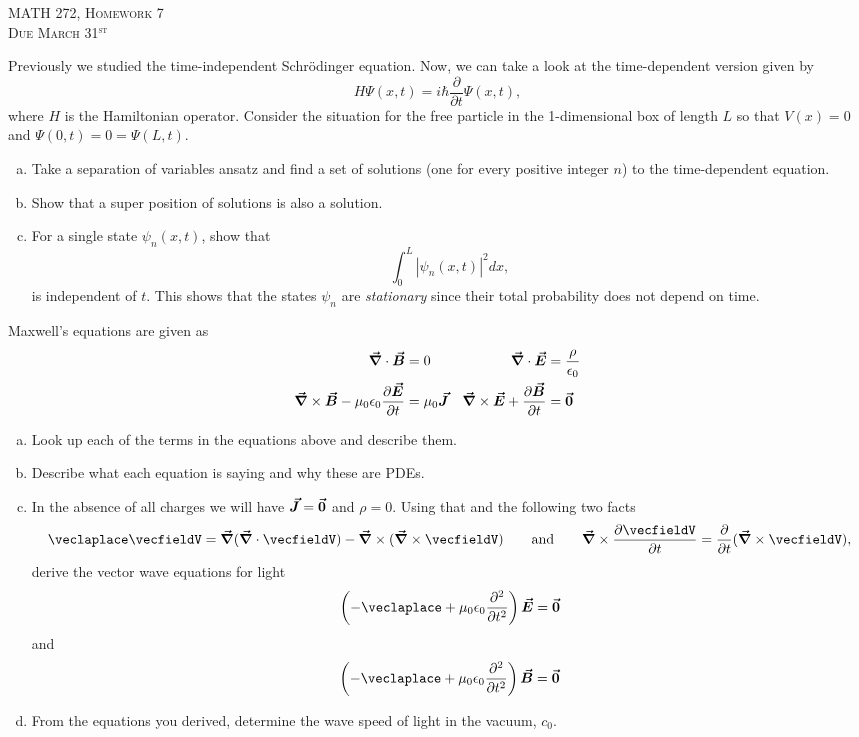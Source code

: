 \documentclass[12pt]{article} %
\newcommand{\grad}{\boldsymbol{\vec{\nabla}}}
\newcommand{\vecfieldE}{\boldsymbol{\vec{E}}}
\newcommand{\vecfieldB}{\boldsymbol{\vec{B}}}
\newcommand{\vecfieldJ}{\boldsymbol{\vec{J}}}
\begin{document}
\begin{center}
   \textsc{\large MATH 272, Homework 7}\\
   \textsc{Due March 31$^\textrm{st}$}
\end{center}
\vspace{.5cm}

\begin{problem}
Previously we studied the time-independent Schr\"odinger equation. Now, we can take a look at the time-dependent version given by
\[
H \Psi(x,t) = i\hbar \frac{\partial}{\partial t} \Psi(x,t),
\]
where $H$ is the Hamiltonian operator.  Consider the situation for the free particle in the 1-dimensional box of length $L$ so that $V(x)=0$ and $\Psi(0,t)=0=\Psi(L,t)$.  
\begin{enumerate}[(a)]
    \item Take a separation of variables ansatz and find a set of solutions (one for every positive integer $n$) to the time-dependent equation.
    \item Show that a super position of solutions is also a solution.
    \item For a single state $\psi_n(x,t)$, show that 
    \[
    \int_0^L \left|\psi_n(x,t)\right|^2 dx,
    \]
    is independent of $t$. This shows that the states $\psi_n$ are \emph{stationary} since their total probability does not depend on time.
\end{enumerate}
\end{problem}


\begin{problem}
Maxwell's equations are given as
\begin{align*}
\grad \cdot \vecfieldB &= 0  & \grad \cdot \vecfieldE &= \frac{\rho}{\epsilon_0}\\
\grad \times \vecfieldB -\mu_0 \epsilon_0\frac{\partial \vecfieldE}{\partial t}&=\mu_0 \vecfieldJ & \grad \times \vecfieldE + \frac{\partial \vecfieldB}{\partial t} &= \zerovec
\end{align*}
\begin{enumerate}[(a)]
    \item Look up each of the terms in the equations above and describe them.
    \item Describe what each equation is saying and why these are PDEs.
    \item In the absence of all charges we will have $\vecfieldJ=\zerovec$ and $\rho=0$.  Using that and the following two facts
    \[
    \veclaplace \vecfieldV = \grad (\grad \cdot \vecfieldV) - \grad \times (\grad \times \vecfieldV) \qquad \textrm{and} \qquad \grad \times \frac{\partial \vecfieldV}{\partial t} = \frac{\partial}{\partial t} (\grad \times \vecfieldV),
    \]
    derive the vector wave equations for light
    \[
    \left( - \veclaplace + \mu_0 \epsilon_0 \frac{\partial^2 }{\partial t^2}\right) \vecfieldE = \zerovec
    \]
    and
    \[
    \left( - \veclaplace + \mu_0 \epsilon_0 \frac{\partial^2 }{\partial t^2}\right) \vecfieldB = \zerovec
    \]
    \item From the equations you derived, determine the wave speed of light in the vacuum, $c_0$.
\end{enumerate}
\end{problem}
 
\end{document}
